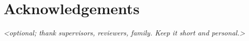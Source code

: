 \chapter*{Acknowledgements}

\textit{<optional; thank supervisors, reviewers, family. Keep it short and personal.>}

